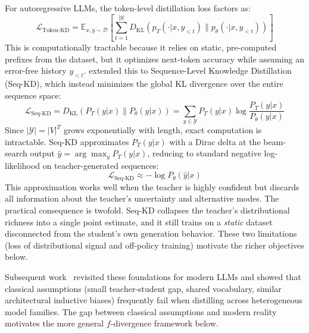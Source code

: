 \documentclass{article} %
\newcommand{\E}{\mathbb{E}}
\newcommand{\KL}{D_{\mathrm{KL}}}
\newcommand{\ptheta}{p_\theta}
\newcommand{\pteacher}{p_T}
\newcommand{\loss}{\mathcal{L}}
\begin{document}
For autoregressive LLMs, the token-level distillation loss factors as:
\begin{equation}
    \loss_{\text{Token-KD}} = \E_{x, y \sim \mathcal{D}} \left[ \sum_{t=1}^{|y|} \KL(\pteacher(\cdot | x, y_{<t}) \parallel \ptheta(\cdot | x, y_{<t})) \right]
\end{equation}
This is computationally tractable because it relies on static, pre-computed prefixes from the dataset, but it optimizes next-token accuracy while assuming an error-free history $y_{<t}$. \citet{kim2016sequence} extended this to Sequence-Level Knowledge Distillation (Seq-KD), which instead minimizes the global KL divergence over the entire sequence space:
\begin{equation}
    \loss_{\text{Seq-KD}} = \KL(P_T(y|x) \parallel P_\theta(y|x)) = \sum_{y \in \mathcal{Y}} P_T(y|x) \log \frac{P_T(y|x)}{P_\theta(y|x)}
\end{equation}
Since $|\mathcal{Y}| = |V|^T$ grows exponentially with length, exact computation is intractable. Seq-KD approximates $P_T(y|x)$ with a Dirac delta at the beam-search output $\hat{y} = \arg\max_y P_T(y|x)$, reducing to standard negative log-likelihood on teacher-generated sequences:
\begin{equation}
    \loss_{\text{Seq-KD}} \approx -\log P_\theta(\hat{y}|x)
\end{equation}
This approximation works well when the teacher is highly confident but discards all information about the teacher's uncertainty and alternative modes. The practical consequence is twofold. Seq-KD collapses the teacher's distributional richness into a single point estimate, and it still trains on a \emph{static} dataset disconnected from the student's own generation behavior. These two limitations (loss of distributional signal and off-policy training) motivate the richer objectives below.

Subsequent work~\citep{2402.11890} revisited these foundations for modern LLMs and showed that classical assumptions (small teacher-student gap, shared vocabulary, similar architectural inductive biases) frequently fail when distilling across heterogeneous model families. The gap between classical assumptions and modern reality motivates the more general $f$-divergence framework below.
\end{document}
